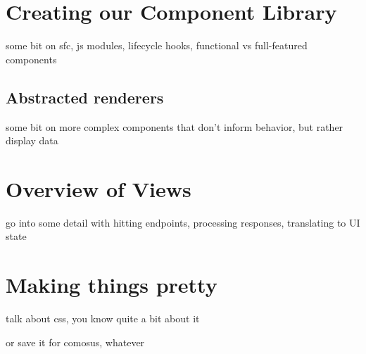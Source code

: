 \documentclass[11pt, twoside, reqno]{book}
\begin{document}
\section{Creating our Component Library}

some bit on sfc, js modules, lifecycle hooks, functional vs full-featured components

\subsection{Abstracted renderers}

some bit on more complex components that don't inform behavior, but rather display data

\section{Overview of Views}

go into some detail with hitting endpoints, processing responses, translating to UI state

\section{Making things pretty}

talk about css, you know quite a bit about it

or save it for comosus, whatever
\end{document}
